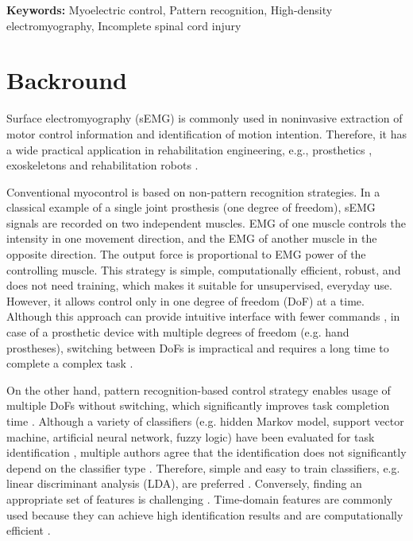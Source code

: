 \textbf{Keywords:} Myoelectric control, Pattern recognition, High-density electromyography, Incomplete spinal cord injury


\section{Backround}

Surface electromyography (sEMG) is commonly used in noninvasive extraction of motor control information and identification of motion intention. Therefore, it has a wide practical application in rehabilitation engineering, e.g., prosthetics \citep{Li2010, Young2013, Stango2015}, exoskeletons \citep{VacaBenitez2013} and rehabilitation robots \citep{Dipietro2005, Marchal-Crespo2009}.

Conventional myocontrol is based on non-pattern recognition strategies. In a classical example of a single joint prosthesis (one degree of freedom), sEMG signals are recorded on two independent muscles. EMG of one muscle controls the intensity in one movement direction, and the EMG of another muscle in the opposite direction. The output force is proportional to EMG power of the controlling muscle. This strategy is simple, computationally efficient, robust, and does not need training, which makes it suitable for unsupervised, everyday use. However, it allows control only in one degree of freedom (DoF) at a time. Although this approach can provide intuitive interface with fewer commands \citep{Hakonen2015}, in case of a prosthetic device with multiple degrees of freedom (e.g. hand prostheses), switching between DoFs is impractical and requires a long time to complete a complex task \citep{Farina2014}.

On the other hand, pattern recognition-based control strategy enables usage of multiple DoFs without switching, which significantly improves task completion time \citep{Hakonen2015}. Although a variety of classifiers (e.g. hidden Markov model, support vector machine, artificial neural network, fuzzy logic) have been evaluated for task identification \citep{Oskoei2007}, multiple authors agree that the identification does not significantly depend on the classifier type \citep{Hakonen2015, Hargrove2007, Zhang2012}. Therefore, simple and easy to train classifiers, e.g. linear discriminant analysis (LDA), are preferred \citep{Scheme2013, Boschmann2013, Young2012, Li2014}. Conversely, finding an appropriate set of features is challenging \citep{Tkach2010, Liu2013, Englehart1999, Oskoei2006}. Time-domain features are commonly used because they can achieve high identification results and are computationally efficient \citep{Hakonen2015}.

